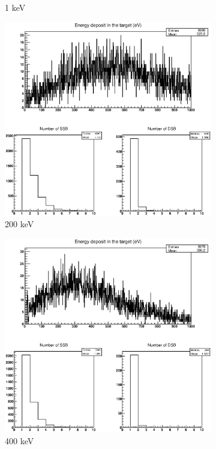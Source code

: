 \begin{figure}
\begin{subfigure}{.5\textwidth}
  \caption{1 keV}
  \label{fig:sub5}
\end{subfigure}%
\begin{subfigure}{.5\textwidth}
  \centering
  \includegraphics[width=.78\linewidth]{./Figures/proton200kev.eps}
  \caption{200 keV}
  \label{fig:sub6}
\end{subfigure}
\begin{subfigure}{.5\textwidth}
  \centering
  \includegraphics[width=.78\linewidth]{./Figures/proton400kev.eps}
  \caption{400 keV}
  \label{fig:sub7}
\end{subfigure}%
\begin{subfigure}{.5\textwidth}
  \centering

\end{subfigure}
\end{figure}

